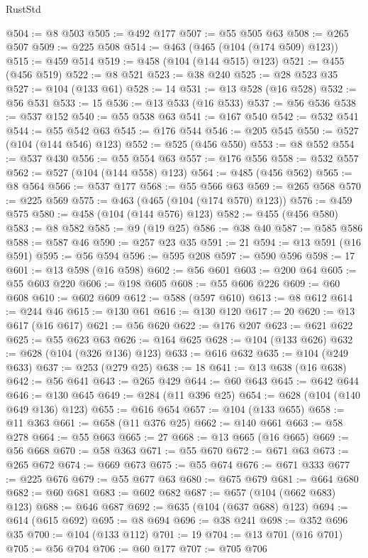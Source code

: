 \begin{lexlean}{RustStd}
\begin{coremodule}
{\begin{coremodule}
{{{{{{{{{{{{{{{{{{{{{{{{{{{{{{{{{{{@504 := @8 @503
@505 := @492 @177
@507 := @55 @505 @63
@508 := @265 @507
@509 := @225 @508
@514 := @463 (@465 (@104 (@174 @509) @123))
@515 := @459 @514
@519 := @458 (@104 (@144 @515) @123)
@521 := @455 (@456 @519)
@522 := @8 @521
@523 := @38 @240
@525 := @28 @523 @35
@527 := @104 (@133 @61)
@528 := 14
@531 := @13 @528 (@16 @528)
@532 := @56 @531
@533 := 15
@536 := @13 @533 (@16 @533)
@537 := @56 @536
@538 := @537 @152
@540 := @55 @538 @63
@541 := @167 @540
@542 := @532 @541
@544 := @55 @542 @63
@545 := @176 @544
@546 := @205 @545
@550 := @527 (@104 (@144 @546) @123)
@552 := @525 (@456 @550)
@553 := @8 @552
@554 := @537 @430
@556 := @55 @554 @63
@557 := @176 @556
@558 := @532 @557
@562 := @527 (@104 (@144 @558) @123)
@564 := @485 (@456 @562)
@565 := @8 @564
@566 := @537 @177
@568 := @55 @566 @63
@569 := @265 @568
@570 := @225 @569
@575 := @463 (@465 (@104 (@174 @570) @123))
@576 := @459 @575
@580 := @458 (@104 (@144 @576) @123)
@582 := @455 (@456 @580)
@583 := @8 @582
@585 := @9 (@19 @25)
@586 := @38 @40
@587 := @585 @586
@588 := @587 @46
@590 := @257 @23 @35
@591 := 21
@594 := @13 @591 (@16 @591)
@595 := @56 @594
@596 := @595 @208
@597 := @590 @596
@598 := 17
@601 := @13 @598 (@16 @598)
@602 := @56 @601
@603 := @200 @64
@605 := @55 @603 @220
@606 := @198 @605
@608 := @55 @606 @226
@609 := @60 @608
@610 := @602 @609
@612 := @588 (@597 @610)
@613 := @8 @612
@614 := @244 @46
@615 := @130 @61
@616 := @130 @120
@617 := 20
@620 := @13 @617 (@16 @617)
@621 := @56 @620
@622 := @176 @207
@623 := @621 @622
@625 := @55 @623 @63
@626 := @164 @625
@628 := @104 (@133 @626)
@632 := @628 (@104 (@326 @136) @123)
@633 := @616 @632
@635 := @104 (@249 @633)
@637 := @253 (@279 @25)
@638 := 18
@641 := @13 @638 (@16 @638)
@642 := @56 @641
@643 := @265 @429
@644 := @60 @643
@645 := @642 @644
@646 := @130 @645
@649 := @284 (@11 @396 @25)
@654 := @628 (@104 (@140 @649 @136) @123)
@655 := @616 @654
@657 := @104 (@133 @655)
@658 := @11 @363
@661 := @658 (@11 @376 @25)
@662 := @140 @661
@663 := @58 @278
@664 := @55 @663
@665 := 27
@668 := @13 @665 (@16 @665)
@669 := @56 @668
@670 := @58 @363
@671 := @55 @670
@672 := @671 @63
@673 := @265 @672
@674 := @669 @673
@675 := @55 @674
@676 := @671 @333
@677 := @225 @676
@679 := @55 @677 @63
@680 := @675 @679
@681 := @664 @680
@682 := @60 @681
@683 := @602 @682
@687 := @657 (@104 (@662 @683) @123)
@688 := @646 @687
@692 := @635 (@104 (@637 @688) @123)
@694 := @614 (@615 @692)
@695 := @8 @694
@696 := @38 @241
@698 := @352 @696 @35
@700 := @104 (@133 @112)
@701 := 19
@704 := @13 @701 (@16 @701)
@705 := @56 @704
@706 := @60 @177
@707 := @705 @706
}}}}}}}}}}}}}}}}}}}}}}}}}}}}}}}}}}}
\end{coremodule}}
\end{coremodule}
\end{lexlean}
